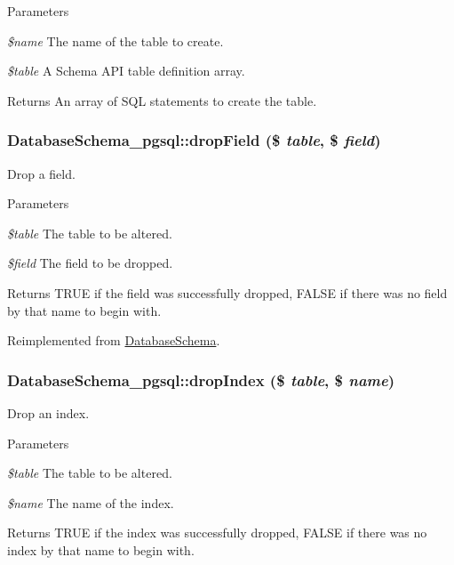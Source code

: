 \begin{DoxyParams}{Parameters}
\item[{\em \$name}]The name of the table to create. \item[{\em \$table}]A Schema API table definition array. \end{DoxyParams}
\begin{DoxyReturn}{Returns}
An array of SQL statements to create the table. 
\end{DoxyReturn}
\hypertarget{classDatabaseSchema__pgsql_a08e3aef1903dc40b2f0c75d4f18507bf}{
\subsubsection[{dropField}]{\setlength{\rightskip}{0pt plus 5cm}DatabaseSchema\_\-pgsql::dropField (\$ {\em table}, \/  \$ {\em field})}}
\label{classDatabaseSchema__pgsql_a08e3aef1903dc40b2f0c75d4f18507bf}
Drop a field.


\begin{DoxyParams}{Parameters}
\item[{\em \$table}]The table to be altered. \item[{\em \$field}]The field to be dropped.\end{DoxyParams}
\begin{DoxyReturn}{Returns}
TRUE if the field was successfully dropped, FALSE if there was no field by that name to begin with. 
\end{DoxyReturn}


Reimplemented from \hyperlink{classDatabaseSchema_a9eee3ae81e40bba206015a83450e1d56}{DatabaseSchema}.\hypertarget{classDatabaseSchema__pgsql_a6c04b76c95ca7f68995baae8b0fe5b08}{
\subsubsection[{dropIndex}]{\setlength{\rightskip}{0pt plus 5cm}DatabaseSchema\_\-pgsql::dropIndex (\$ {\em table}, \/  \$ {\em name})}}
\label{classDatabaseSchema__pgsql_a6c04b76c95ca7f68995baae8b0fe5b08}
Drop an index.


\begin{DoxyParams}{Parameters}
\item[{\em \$table}]The table to be altered. \item[{\em \$name}]The name of the index.\end{DoxyParams}
\begin{DoxyReturn}{Returns}
TRUE if the index was successfully dropped, FALSE if there was no index by that name to begin with. 
\end{DoxyReturn}


